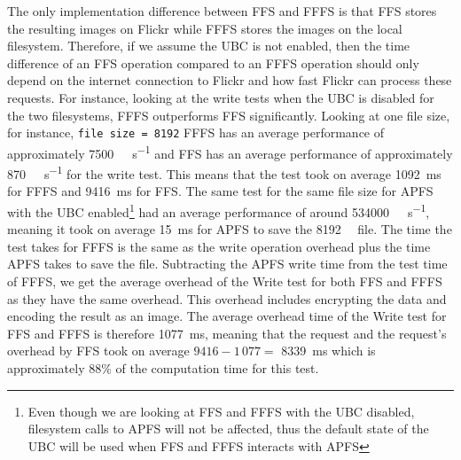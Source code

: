The only implementation difference between \gls{FFS} and \gls{FFFS} is that \gls{FFS} stores the resulting images on Flickr while \gls{FFFS} stores the images on the local filesystem. Therefore, if we assume the \gls{UBC} is not enabled, then the time difference of an \gls{FFS} operation compared to an \gls{FFFS} operation should only depend on the internet connection to Flickr and how fast Flickr can process these requests. For instance, looking at the write tests when the \gls{UBC} is disabled for the two filesystems, \gls{FFFS} outperforms \gls{FFS} significantly. Looking at one file size, for instance, \texttt{file size = \num{8192}} \gls{FFFS} has an average performance of approximately \SI[per-mode = symbol]{7500}{\kilo\byte\per\second} and \gls{FFS} has an average performance of approximately \SI[per-mode = symbol]{870}{\kilo\byte\per\second} for the write test. This means that the test took on average \SI{1092}{\milli\second} for \gls{FFFS} and \SI{9416}{\milli\second} for \gls{FFS}. The same test for the same file size for \gls{APFS} with the \gls{UBC} enabled\footnote{Even though we are looking at \gls{FFS} and \gls{FFFS} with the \gls{UBC} disabled, filesystem calls to \gls{APFS} will not be affected, thus the default state of the \gls{UBC} will be used when \gls{FFS} and \gls{FFFS} interacts with \gls{APFS}} had an average performance of around \SI[per-mode = symbol]{534000}{\kilo\byte\per\second}, meaning it took on average \SI[per-mode = symbol]{15}{\milli\second} for \gls{APFS} to save the \SI[per-mode = symbol]{8192}{\kilo\byte} file. The time the test takes for \gls{FFFS} is the same as the write operation overhead plus the time \gls{APFS} takes to save the file. Subtracting the \gls{APFS} write time from the test time of \gls{FFFS}, we get the average overhead of the Write test for both \gls{FFS} and \gls{FFFS} as they have the same overhead. This overhead includes encrypting the data and encoding the result as an image. The average overhead time of the Write test for \gls{FFS} and \gls{FFFS} is therefore \SI[per-mode = symbol]{1077}{\milli\second}, meaning that the request and the request's overhead by \gls{FFS} took on average $\num{9416} - 1\,077 =$ \SI{8339}{\milli\second} which is approximately 88\% of the computation time for this test.  %
